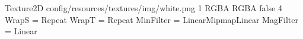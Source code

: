 Texture2D
config/resources/textures/img/white.png
1
RGBA
RGBA
false
4
WrapS = Repeat
WrapT = Repeat
MinFilter = LinearMipmapLinear
MagFilter = Linear
